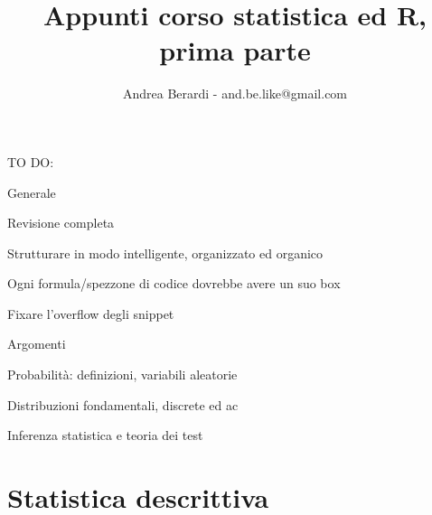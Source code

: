 \documentclass[a4paper]{article}
\title{Appunti corso statistica ed R, prima parte}
\author{Andrea Berardi - and.be.like@gmail.com}
\begin{document}

\maketitle

TO DO:
\begin{list}{*}{}
\item Generale
\begin{list}{-}{}
\item Revisione completa
\item Strutturare in modo intelligente, organizzato ed organico
\item Ogni formula/spezzone di codice dovrebbe avere un suo box
\item Fixare l'overflow degli snippet
\end{list}
\item Argomenti
\begin{list}{-}{}
\item Probabilit\`{a}: definizioni, variabili aleatorie
\item Distribuzioni fondamentali, discrete ed ac
\item Inferenza statistica e teoria dei test
\end{list}
\end{list}

\newpage
\tableofcontents
\newpage


\section{Statistica descrittiva}
\end{document}

